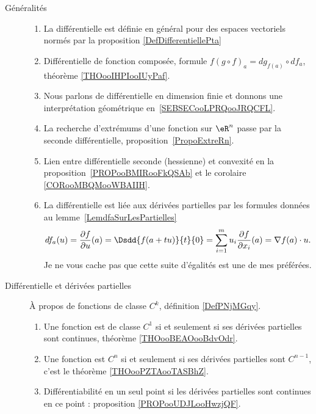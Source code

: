 
\begin{description}
	\item[Généralités]
	      \begin{enumerate}
		      \item
		            La différentielle est définie en général pour des espaces vectoriels normés par la proposition \ref{DefDifferentiellePta}
		      \item
		            Différentielle de fonction composée, formule \( f(g\circ f)_a=dg_{f(a)}\circ df_a\), théorème \ref{THOooIHPIooIUyPaf}.
		      \item
		            Nous parlons de différentielle en dimension finie et donnons une interprétation géométrique en~\ref{SEBSECooLPRQooJRQCFL}.
		      \item
		            La recherche d'extrémums d'une fonction sur \( \eR^n\) passe par la seconde différentielle, proposition~\ref{PropoExtreRn}.
		      \item
		            Lien entre différentielle seconde (hessienne) et convexité en la proposition~\ref{PROPooBMIRooFkQSAb} et le corolaire \ref{CORooMBQMooWBAIIH}.
		      \item
		            La différentielle est liée aux dérivées partielles par les formules données au lemme~\ref{LemdfaSurLesPartielles}
		            \begin{equation}
			            df_a(u)=\frac{ \partial f }{ \partial u }(a)=\Dsdd{ f(a+tu) }{t}{0}=\sum_{i=1}^mu_i\frac{ \partial f }{ \partial x_i }(a)=\nabla f(a)\cdot u.
		            \end{equation}
		            Je ne vous cache pas que cette suite d'égalités est une de mes préférées.
	      \end{enumerate}
	\item[Différentielle et dérivées partielles]
	      À propos de fonctions de classe \( C^k\), définition \ref{DefPNjMGqy}.
	      \begin{enumerate}
		      \item
		            Une fonction est de classe \( C^1\) si et seulement si ses dérivées partielles sont continues, théorème \ref{THOooBEAOooBdvOdr}.
		      \item
		            Une fonction est \( C^n\) si et seulement si ses dérivées partielles sont \( C^{n-1}\), c'est le théorème \ref{THOooPZTAooTASBhZ}.
		      \item
		            Différentiabilité en un seul point si les dérivées partielles sont continues en ce point : proposition \ref{PROPooUDJLooHwzjQF}.

\end{enumerate}
\end{description}
